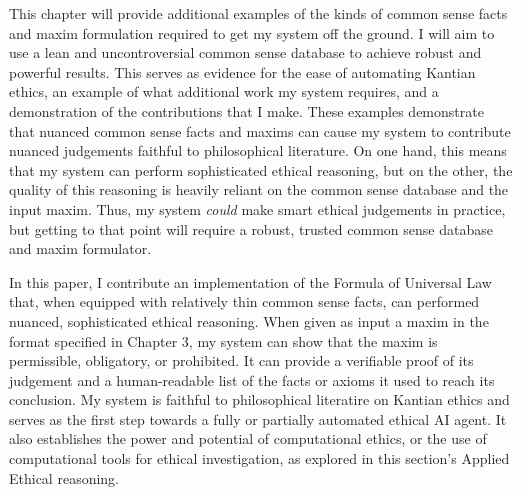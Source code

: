 \begin{isabellebody}
\begin{isamarkuptext}
This chapter will provide additional examples of the kinds of common sense facts and maxim formulation required to get my system
off the ground. I will aim to use a lean and uncontroversial common sense database
to achieve robust and powerful results. This serves as evidence for the ease of automating
Kantian ethics, an example of what additional work my system requires, and a demonstration of the contributions
that I make. These examples demonstrate that nuanced common sense facts and maxims can cause my system to contribute 
nuanced judgements faithful to philosophical literature. On one hand, this means that my system can perform
sophisticated ethical reasoning, but on the other, the quality of this reasoning is heavily reliant on 
the common sense database and the input maxim. Thus, my system \emph{could} make smart ethical judgements 
in practice, but getting to that point will require a robust, trusted common sense database and maxim
formulator.

In this paper, I contribute an implementation of the Formula of Universal Law that, when equipped with 
relatively thin common sense facts, can performed nuanced, sophisticated ethical reasoning. When given 
as input a maxim in the format specified in Chapter 3, my system can show that the maxim is permissible, 
obligatory, or prohibited. It can provide a verifiable proof of its judgement and a human-readable list
of the facts or axioms it used to reach its conclusion. My system is faithful to philosophical literatire
on Kantian ethics and serves as the first step towards a fully or partially automated ethical AI agent. 
It also establishes the power and potential of computational ethics, or the use of computational tools
for ethical investigation, as explored in this section's Applied Ethical reasoning. 


\end{isamarkuptext}
\end{isabellebody}
